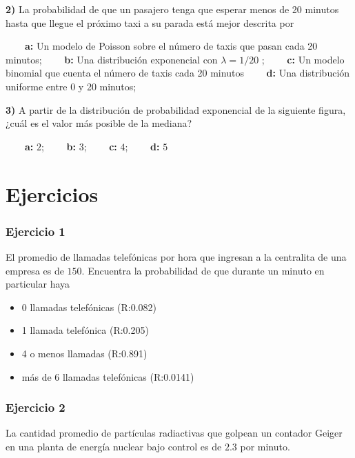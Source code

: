 \documentclass[
]{book}
\providecommand{\tightlist}{%
  \setlength{\itemsep}{0pt}\setlength{\parskip}{0pt}}
\begin{document}
\textbf{2)} La probabilidad de que un pasajero tenga que esperar menos de 20 minutos hasta que llegue el próximo taxi a su parada está mejor descrita por

\textbf{\(\qquad\)a:} Un modelo de Poisson sobre el número de taxis que pasan cada 20 minutos;
\textbf{\(\qquad\)b:} Una distribución exponencial con \(\lambda=1/20\) ;
\textbf{\(\qquad\)c:} Un modelo binomial que cuenta el número de taxis cada 20 minutos
\textbf{\(\qquad\)d:} Una distribución uniforme entre 0 y 20 minutos;

\textbf{3)} A partir de la distribución de probabilidad exponencial de la siguiente figura, ¿cuál es el valor más posible de la mediana?

\textbf{\(\qquad\)a:} \(2\); \textbf{\(\qquad\)b:} \(3\); \textbf{\(\qquad\)c:} \(4\); \textbf{\(\qquad\)d:} \(5\)

\hypertarget{ejercicios-6}{%
\section{Ejercicios}\label{ejercicios-6}}

\hypertarget{ejercicio-1-5}{%
\subsubsection{Ejercicio 1}\label{ejercicio-1-5}}

El promedio de llamadas telefónicas por hora que ingresan a la centralita de una empresa es de \(150\). Encuentra la probabilidad de que durante un minuto en particular haya

\begin{itemize}
\tightlist
\item
  0 llamadas telefónicas (R:0.082)
\item
  1 llamada telefónica (R:0.205)
\item
  4 o menos llamadas (R:0.891)
\item
  más de 6 llamadas telefónicas (R:0.0141)
\end{itemize}

\hypertarget{ejercicio-2-5}{%
\subsubsection{Ejercicio 2}\label{ejercicio-2-5}}

La cantidad promedio de partículas radiactivas que golpean un contador Geiger en una planta de energía nuclear bajo control es de \(2.3\) por minuto.
\end{document}
